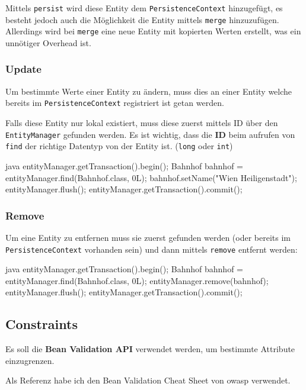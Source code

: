 Mittels \texttt{persist} wird diese Entity dem \texttt{PersistenceContext} hinzugefügt, es besteht jedoch auch die Möglichkeit die Entity mittels \texttt{merge} hinzuzufügen. Allerdings wird bei \texttt{merge} eine neue Entity mit kopierten Werten erstellt, was ein unnötiger Overhead ist.

\subsubsection{Update}

Um bestimmte Werte einer Entity zu ändern, muss dies an einer Entity welche bereits im \texttt{PersistenceContext} registriert ist getan werden.

Falls diese Entity nur lokal existiert, muss diese zuerst mittels ID über den \texttt{EntityManager} gefunden werden. Es ist wichtig, dass die \textbf{ID} beim aufrufen von \texttt{find} der richtige Datentyp von der Entity ist. (\texttt{long} oder \texttt{int})

\begin{code}{java}
entityManager.getTransaction().begin();
Bahnhof bahnhof = entityManager.find(Bahnhof.class, 0L);
bahnhof.setName("Wien Heiligenstadt");
entityManager.flush();
entityManager.getTransaction().commit();
\end{code}

\subsubsection{Remove}

Um eine Entity zu entfernen muss sie zuerst gefunden werden (oder bereits im \texttt{PersistenceContext} vorhanden sein) und dann mittels \texttt{remove} entfernt werden:

\begin{code}{java}
entityManager.getTransaction().begin();
Bahnhof bahnhof = entityManager.find(Bahnhof.class, 0L);
entityManager.remove(bahnhof);
entityManager.flush();
entityManager.getTransaction().commit();
\end{code}

\clearpage
\subsection{Constraints}

Es soll die \textbf{Bean Validation API} verwendet werden, um bestimmte Attribute einzugrenzen.

Als Referenz habe ich den Bean Validation Cheat Sheet von owasp \cite{owasp:beanValidationCheatSheet} verwendet.

